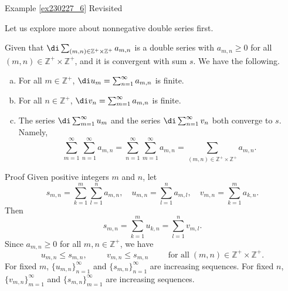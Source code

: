 \begin{example}{\linkt Example \ref{ex230227_6} Revisited}
\begin{example}[label=ex230227_13]{}
\begin{example}{}
\begin{example}[label=ex230301_6]{}
Let us explore more about
  nonnegative double series first.

\begin{theorem}[label=230302_6]{}
Given that $\di\sum_{(m,n)\in\mathbb{Z}^+\times\mathbb{Z}^+}a_{m,n}$ is a double series with $a_{m,n}\geq 0$ for all $(m,n)\in\mathbb{Z}^+\times\mathbb{Z}^+$, and 
it is convergent with sum $s$.  We have the following.
\begin{enumerate}[(a)]
\item For all $m\in\mathbb{Z}^+$, $\di u_m=\sum_{n=1}^{\infty}a_{m,n}$ is finite.
\item For all $n\in\mathbb{Z}^+$, $\di v_n=\sum_{m=1}^{\infty}a_{m,n}$ is finite.
\item The series $\di\sum_{m=1}^{\infty}u_m$ and the series $\di\sum_{n=1}^{\infty}v_n$ both converge to $s$. Namely,
\[\sum_{m=1}^{\infty} \sum_{n=1}^{\infty} a_{m,n} =\sum_{n=1}^{\infty} \sum_{m=1}^{\infty} a_{m,n}=\sum_{(m,n)\in\mathbb{Z}^+\times\mathbb{Z}^+}a_{m,n}.\]
 \end{enumerate}
\end{theorem}
\begin{myproof}{Proof}
Given positive integers $m$ and $n$, let
\[s_{m,n}=\sum_{k=1}^m\sum_{l=1}^na_{m,n},\quad u_{m,n}=\sum_{l=1}^n a_{m,l},\quad v_{m,n}=\sum_{k=1}^ma_{k,n}.\]Then 
\begin{equation}\label{eq230302_7}
s_{m,n}=\sum_{k=1}^mu_{k,n}=\sum_{l=1}^n v_{m,l}.\end{equation}Since $a_{m,n}\geq 0$ for all $m, n\in\mathbb{Z}^+$, we have
\[u_{m,n}\leq s_{m,n},\hspace{1cm}v_{m,n}\leq s_{m,n}\hspace{1cm}\text{for all}\;(m,n)\in\mathbb{Z}^+\times\mathbb{Z}^+.\]
For fixed $m$, $\{u_{m,n}\}_{n=1}^{\infty}$ and  $\{s_{m,n}\}_{n=1}^{\infty}$ are increasing sequences. For fixed $n$, $\{v_{m,n}\}_{m=1}^{\infty}$  and  $\{s_{m,n}\}_{m=1}^{\infty}$ are  increasing sequences.  


\end{myproof}
\end{example}
\end{example}
\end{example}
\end{example}
